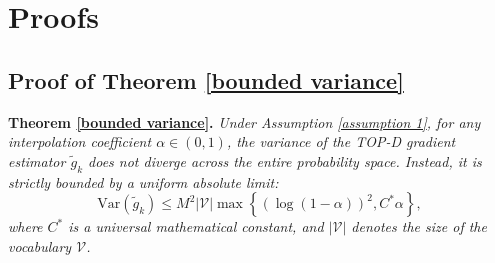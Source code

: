 \documentclass{article}
\theoremstyle{plain}
\theoremstyle{definition}
\theoremstyle{remark}
\begin{document}
\newpage
\section{Proofs}

\subsection{Proof of Theorem \ref{bounded variance}} \label{proof of bounded variance}
\textbf{Theorem \ref{bounded variance}.} \textit{
	Under Assumption \ref{assumption 1}, for any interpolation coefficient $\alpha\in(0,1)$, the variance of the TOP-D gradient estimator $\tilde{g}_k$ does not diverge across the entire probability space. Instead, it is strictly bounded by a uniform absolute limit:
	\begin{equation}
		\mathrm{Var}(\tilde{g}_k)\leq M^2\lvert\mathcal{V}\rvert\max\left\{\left(\log(1-\alpha)\right)^2, C^*\alpha\right\},
	\end{equation}
	where $C^*$ is a universal mathematical constant, and $\lvert\mathcal{V}\rvert$ denotes the size of the vocabulary $\mathcal{V}$.
}
\end{document}
